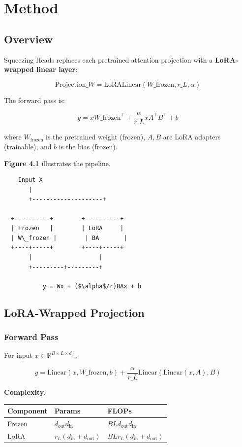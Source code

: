 
\section{Method}

\subsection{Overview}

Squeezing Heads replaces each pretrained attention projection with a 
\textbf{LoRA-wrapped linear layer}:

\[
\text{Projection}\_{W} = \text{LoRALinear}(W\_\text{frozen}, r\_L, \alpha)
\]

The forward pass is:

\[
y = x W\_\text{frozen}^\top + \frac{\alpha}{r\_L} x A^\top B^\top + b
\]

where $W_\text{frozen}$ is the pretrained weight (frozen), $A, B$ are LoRA 
adapters (trainable), and $b$ is the bias (frozen).

\textbf{Figure 4.1} illustrates the pipeline.

\begin{lstlisting}
    Input X
       |
       +--------------------+
                             
  +----------+        +----------+
  | Frozen   |        | LoRA     |
  | W\_frozen |        | BA       |
  +----+-----+        +----+-----+
       |                   |
       +---------+---------+
                  
           y = Wx + ($\alpha$/r)BAx + b
\end{lstlisting}

\subsection{LoRA-Wrapped Projection}

\subsubsection{Forward Pass}

For input $x \in \mathbb{R}^{B \times L \times d_\text{in}}$:

\[
y = \text{Linear}(x, W\_\text{frozen}, b) + \frac{\alpha}{r\_L} \text{Linear}(\text{Linear}(x, A), B)
\]

\textbf{Complexity.}

\begin{table}[H]
\centering
\small
\begin{tabular}{lll}
\toprule
\textbf{Component} & \textbf{Params} & \textbf{FLOPs} \\
\midrule
Frozen & $d_\text{out} d_\text{in}$ & $B L d_\text{out} d_\text{in}$ \\
LoRA & $r_L (d_\text{in} + d_\text{out})$ & $B L r_L (d_\text{in} + d_\text{out})$ \\
\bottomrule
\end{tabular}
\end{table}

